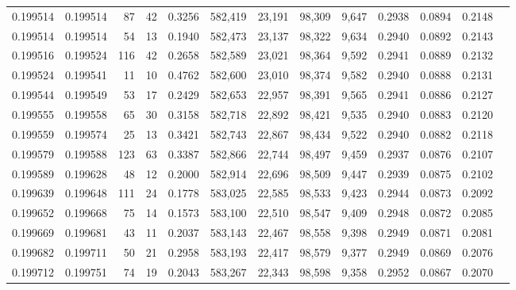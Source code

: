 \begin{tabular}{rrrrrrrrrrrrr}
0.199514 & 0.199514 &    87 &  42 &                                     0.3256 & 582,419 &  23,191 &  98,309 &   9,647 & 0.2938 & 0.0894 & 0.2148 \\
0.199514 & 0.199514 &    54 &  13 &                                     0.1940 & 582,473 &  23,137 &  98,322 &   9,634 & 0.2940 & 0.0892 & 0.2143 \\
0.199516 & 0.199524 &   116 &  42 &                                     0.2658 & 582,589 &  23,021 &  98,364 &   9,592 & 0.2941 & 0.0889 & 0.2132 \\
0.199524 & 0.199541 &    11 &  10 &                                     0.4762 & 582,600 &  23,010 &  98,374 &   9,582 & 0.2940 & 0.0888 & 0.2131 \\
0.199544 & 0.199549 &    53 &  17 &                                     0.2429 & 582,653 &  22,957 &  98,391 &   9,565 & 0.2941 & 0.0886 & 0.2127 \\
0.199555 & 0.199558 &    65 &  30 &                                     0.3158 & 582,718 &  22,892 &  98,421 &   9,535 & 0.2940 & 0.0883 & 0.2120 \\
0.199559 & 0.199574 &    25 &  13 &                                     0.3421 & 582,743 &  22,867 &  98,434 &   9,522 & 0.2940 & 0.0882 & 0.2118 \\
0.199579 & 0.199588 &   123 &  63 &                                     0.3387 & 582,866 &  22,744 &  98,497 &   9,459 & 0.2937 & 0.0876 & 0.2107 \\
0.199589 & 0.199628 &    48 &  12 &                                     0.2000 & 582,914 &  22,696 &  98,509 &   9,447 & 0.2939 & 0.0875 & 0.2102 \\
0.199639 & 0.199648 &   111 &  24 &                                     0.1778 & 583,025 &  22,585 &  98,533 &   9,423 & 0.2944 & 0.0873 & 0.2092 \\
0.199652 & 0.199668 &    75 &  14 &                                     0.1573 & 583,100 &  22,510 &  98,547 &   9,409 & 0.2948 & 0.0872 & 0.2085 \\
0.199669 & 0.199681 &    43 &  11 &                                     0.2037 & 583,143 &  22,467 &  98,558 &   9,398 & 0.2949 & 0.0871 & 0.2081 \\
0.199682 & 0.199711 &    50 &  21 &                                     0.2958 & 583,193 &  22,417 &  98,579 &   9,377 & 0.2949 & 0.0869 & 0.2076 \\
0.199712 & 0.199751 &    74 &  19 &                                     0.2043 & 583,267 &  22,343 &  98,598 &   9,358 & 0.2952 & 0.0867 & 0.2070 \\

\end{tabular}

